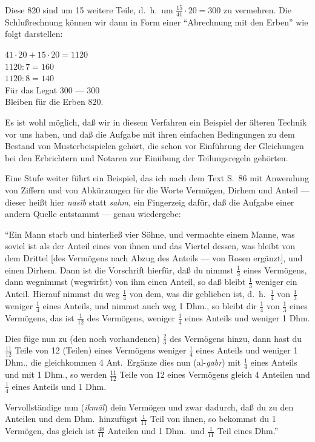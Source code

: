 \documentclass[11pt,a4paper]{article}
\newcommand{\enquote}[1]{``#1''}
\begin{document}
Diese 820 sind um 15 weitere Teile, d.\ h.\ um $\frac{15}{41} \cdot 20 = 300$ zu vermehren. Die Schlu\ss{}rechnung k\"onnen wir dann in Form einer \enquote{Abrechnung mit den Erben} wie folgt darstellen:
\begin{center}
$41 \cdot 20 + 15 \cdot 20 = 1120$\\
$1120 : 7 = 160$\\
$1120 : 8 = 140$\\
F\"ur das Legat $300$ --- $300$\\
Bleiben f\"ur die Erben $820$.
\end{center}

Es ist wohl m\"oglich, da\ss{} wir in diesem Verfahren ein Beispiel der \"alteren Technik vor uns haben, und da\ss{} die Aufgabe mit ihren einfachen Bedingungen zu dem Bestand von Musterbeispielen geh\"ort, die schon vor Einf\"uhrung der Gleichungen bei den Erbrichtern und Notaren zur Ein\"ubung der Teilungsregeln geh\"orten.

Eine Stufe weiter f\"uhrt ein Beispiel, das ich nach dem Text S.\ 86 mit Anwendung von Ziffern und von Abk\"urzungen f\"ur die Worte Verm\"ogen, Dirhem und Anteil --- dieser hei\ss{}t hier \textit{nas\={i}b} statt \textit{sahm}, ein Fingerzeig daf\"ur, da\ss{} die Aufgabe einer andern Quelle entstammt --- genau wiedergebe:

\enquote{Ein Mann starb und hinterlie\ss{} vier S\"ohne, und vermachte einem Manne, was soviel ist als der Anteil eines von ihnen und das Viertel dessen, was bleibt von dem Drittel [des Verm\"ogens nach Abzug des Anteils --- von Rosen erg\"anzt], und einen Dirhem. Dann ist die Vorschrift hierf\"ur, da\ss{} du nimmst $\frac{1}{3}$ eines Verm\"ogens, dann wegnimmst (wegwirfst) von ihm einen Anteil, so da\ss{} bleibt $\frac{1}{3}$ weniger ein Anteil. Hierauf nimmst du weg $\frac{1}{4}$ von dem, was dir geblieben ist, d.\ h.\ $\frac{1}{4}$ von $\frac{1}{3}$ weniger $\frac{1}{4}$ eines Anteils, und nimmst auch weg 1 Dhm., so bleibt dir $\frac{1}{4}$ von $\frac{1}{3}$ eines Verm\"ogens, das ist $\frac{1}{12}$ des Verm\"ogens, weniger $\frac{1}{4}$ eines Anteils und weniger 1 Dhm.

Dies f\"uge nun zu (den noch vorhandenen) $\frac{2}{3}$ des Verm\"ogens hinzu, dann hast du $\frac{11}{12}$ Teile von 12 (Teilen) eines Verm\"ogens weniger $\frac{1}{4}$ eines Anteils und weniger 1 Dhm., die gleichkommen 4 Ant.\ Erg\"anze dies nun (al-\textit{gabr}) mit $\frac{1}{4}$ eines Anteils und mit 1 Dhm., so werden $\frac{11}{12}$ Teile von 12 eines Verm\"ogens gleich 4 Anteilen und $\frac{1}{4}$ eines Anteils und 1 Dhm.

Vervollst\"andige nun (\textit{ikm\=al}) dein Verm\"ogen und zwar dadurch, da\ss{} du zu den Anteilen und dem Dhm.\ hinzuf\"ugst $\frac{1}{11}$ Teil von ihnen, so bekommst du 1 Verm\"ogen, das gleich ist $\frac{48}{11}$ Anteilen und 1 Dhm.\ und $\frac{1}{11}$ Teil eines Dhm.}
\end{document}
